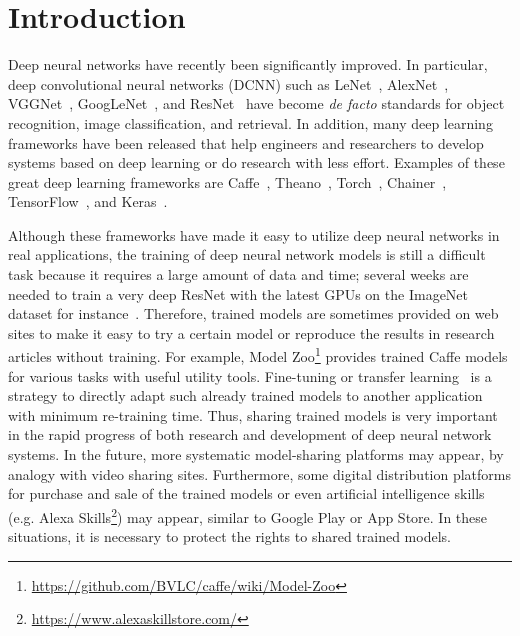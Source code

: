 \documentclass[10pt,twocolumn,letterpaper]{article}
\begin{document}





\section{Introduction}
Deep neural networks have recently been significantly improved.
In particular, deep convolutional neural networks (DCNN) such as LeNet~\cite{lec_ieee98}, AlexNet~\cite{kri_nips12}, VGGNet~\cite{Simonyan_iclr15}, GoogLeNet~\cite{Szegedy_cvpr15}, and ResNet~\cite{He_cvpr16} have become \textit{de facto} standards for object recognition, image classification, and retrieval.
In addition, many deep learning frameworks have been released that help engineers and researchers to develop systems based on deep learning or do research with less effort.
Examples of these great deep learning frameworks are
Caffe~\cite{jia_mm14},
Theano~\cite{bergstra_scipy10},
Torch~\cite{collobert_nipsw11},
Chainer~\cite{tokui_nipsw15},
TensorFlow~\cite{abadi_arxiv16},
and Keras~\cite{chollet_github15}.

Although these frameworks have made it easy to utilize deep neural networks in real applications, the training of deep neural network models is still a difficult task because it requires a large amount of data and time; several weeks are needed to train a very deep ResNet with the latest GPUs on the ImageNet dataset for instance~\cite{He_cvpr16}.
Therefore, trained models are sometimes provided on web sites to make it easy to try a certain model or reproduce the results in research articles without training.
For example, Model Zoo\footnote{\url{https://github.com/BVLC/caffe/wiki/Model-Zoo}} provides trained Caffe models for various tasks with useful utility tools.
Fine-tuning or transfer learning~\cite{Simonyan_iclr15} is a strategy to directly adapt such already trained models to another application with minimum re-training time.
Thus, sharing trained models is very important in the rapid progress of both research and development of deep neural network systems.
In the future, more systematic model-sharing platforms may appear, by analogy with video sharing sites.
Furthermore, some digital distribution platforms for purchase and sale of the trained models or even artificial intelligence skills (e.g. Alexa Skills\footnote{\url{https://www.alexaskillstore.com/}}) may appear, similar to Google Play or App Store.
In these situations, it is necessary to protect the rights to shared trained models.
\end{document}
